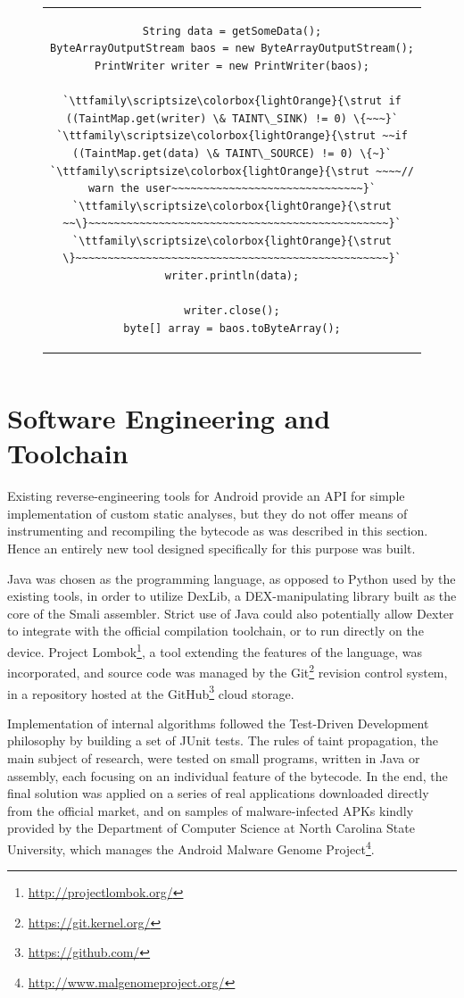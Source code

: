 \documentclass[12pt,twoside,notitlepage]{report}
\newcommand{\highlight}[1]{\colorbox{lightOrange}{\strut #1}}
\newcommand{\lsthl}[1] {\ttfamily\scriptsize\highlight{#1}}
\newcommand{\weblink}[1] {\footnote{\scriptsize\url{#1}}}
\begin{document}
\begin{figure}[h]
	\centering
	\begin{tabular}{c}
	\begin{lstlisting}
String data = getSomeData();
ByteArrayOutputStream baos = new ByteArrayOutputStream();
PrintWriter writer = new PrintWriter(baos);

`\lsthl{if ((TaintMap.get(writer) \& TAINT\_SINK) != 0) \{~~~}`
`\lsthl{~~if ((TaintMap.get(data) \& TAINT\_SOURCE) != 0) \{~}`
`\lsthl{~~~~// warn the user~~~~~~~~~~~~~~~~~~~~~~~~~~~~~~}`
`\lsthl{~~\}~~~~~~~~~~~~~~~~~~~~~~~~~~~~~~~~~~~~~~~~~~~~~~~}`
`\lsthl{\}~~~~~~~~~~~~~~~~~~~~~~~~~~~~~~~~~~~~~~~~~~~~~~~~~}`
writer.println(data);

writer.close();
byte[] array = baos.toByteArray();
	\end{lstlisting}
	\end{tabular}
	\begin{lstlisting}[caption={Writer interface used to turn data into a byte array, with sink instrumentation.},
	                   label={listing:Sink_ByteArray}]
	\end{lstlisting}
\end{figure}

\section{Software Engineering and Toolchain}

Existing reverse-engineering tools for Android provide an API for simple implementation of custom static analyses, but they do not offer means of instrumenting and recompiling the bytecode as was described in this section. Hence an entirely new tool designed specifically for this purpose was built.

Java was chosen as the programming language, as opposed to Python used by the existing tools, in order to utilize DexLib, a DEX-manipulating library built as the core of the Smali assembler. Strict use of Java could also potentially allow Dexter to integrate with the official compilation toolchain, or to run directly on the device. Project Lombok\weblink{http://projectlombok.org/}, a tool extending the features of the language, was incorporated, and source code was managed by the Git\weblink{https://git.kernel.org/} revision control system, in a repository hosted at the GitHub\weblink{https://github.com/} cloud storage.

Implementation of internal algorithms followed the Test-Driven Development philosophy by building a set of JUnit tests. The rules of taint propagation, the main subject of research, were tested on small programs, written in Java or assembly, each focusing on an individual feature of the bytecode. In the end, the final solution was applied on a series of real applications downloaded directly from the official market, and on samples of malware-infected APKs kindly provided by the Department of Computer Science at North Carolina State University, which manages the Android Malware Genome Project\weblink{http://www.malgenomeproject.org/}.
\end{document}

